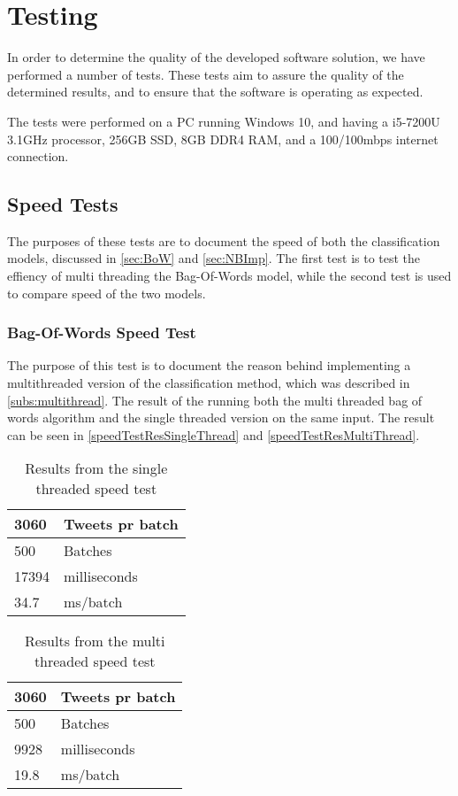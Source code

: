 \chapter{Testing}\label{cha:testing}
In order to determine the quality of the developed software solution, we have
performed a number of tests. These tests aim to assure the quality of the
determined results, and to ensure that the software is operating as expected.\nl

The tests were performed on a PC running Windows 10, and having a i5-7200U
3.1GHz processor, 256GB SSD, 8GB DDR4 RAM, and a 100/100mbps internet
connection.

\section{Speed Tests}\label{speedtestlavel}
The purposes of these tests are to document the speed of both the
classification models, discussed in \autoref{sec:BoW} and
\autoref{sec:NBImp}. The first test is to test the effiency of multi threading
the Bag-Of-Words model, while the second test is used to compare speed of the
two models.

\subsection{Bag-Of-Words Speed Test}
The purpose of this test is to document the reason behind implementing a
multithreaded version of the classification method, which was described in
\autoref{subs:multithread}. 
The result of the running both the multi threaded bag of words algorithm and the
single threaded version on the same input. The result can be seen in
\autoref{speedTestResSingleThread} and \autoref{speedTestResMultiThread}.

\begin{table}[H]\centering
\begin{tabular}{|l|l|}
\hline
3060	&	Tweets pr batch 	\\\hline
500		&	Batches				\\\hline
17394	&	milliseconds		\\\hline
34.7	&	ms/batch 			\\\hline
\end{tabular}
\caption{Results from the single threaded speed test}
\label{speedTestResSingleThread}
\end{table}

\begin{table}[H]\centering
\begin{tabular}{|l|l|}
\hline
3060	&	Tweets pr batch 	\\\hline
500		&	Batches				\\\hline
9928 	&	milliseconds		\\\hline
19.8	&	ms/batch 			\\\hline
\end{tabular}
\caption{Results from the multi threaded speed test}
\label{speedTestResMultiThread}
\end{table}

